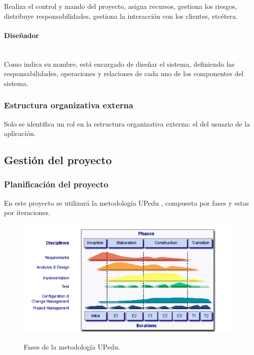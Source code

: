\documentclass[twoside]{report}
\begin{document}
Realiza el control y mando del proyecto, asigna recursos, gestiona los riesgos, distribuye responsabilidades, gestiona la interacción con los clientes, etcétera.

\paragraph{Diseñador}\mbox{}\\

Como indica su nombre, está encargado de diseñar el sistema, definiendo las responsabilidades, operaciones y relaciones de cada uno de los componentes del sistema.

\subsubsection{Estructura organizativa externa}
Solo se identifica un rol en la estructura organizativa externa: el del usuario de la aplicación. 

\subsection{Gestión del proyecto}
\subsubsection{Planificación del proyecto}
En este proyecto se utilizará la metodología UPedu \cite{upedu}, compuesta por fases y estas por iteraciones.

\begin{figure}[h]
\begin{center}
\includegraphics[scale=0.75]{images/upeduFases}
\caption{Fases de la metodología UPedu.} 
\label{upeduChart}
\cite{upedu}
\end{center}
\end{figure}
\end{document}
